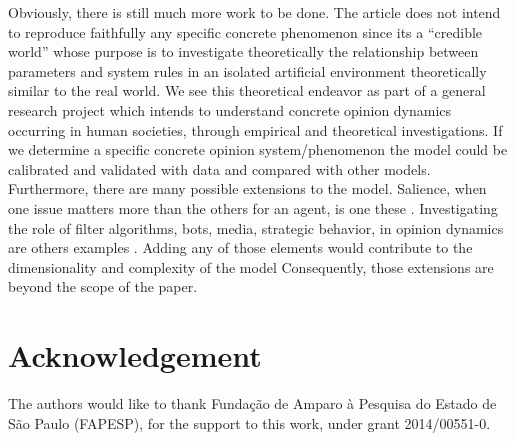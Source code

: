 \documentclass{article}
\begin{document}
    Obviously, there is still much more work to be done. The article does not
    intend to reproduce faithfully any specific concrete phenomenon since its a
    ``credible world'' \cite{sugden2000credible, sugden2009credible} whose
    purpose is to investigate theoretically the relationship between parameters
    and system rules in an isolated artificial environment theoretically similar
    to the real world. We see this theoretical endeavor as part of a general
    research project which intends to understand concrete opinion dynamics
    occurring in human societies, through empirical and theoretical
    investigations. If we determine a specific concrete opinion
    system/phenomenon the model could be calibrated and validated with data and
    compared with other models. Furthermore, there are many possible extensions
    to the model. Salience, when one issue matters more than the others for an
    agent, is one these \cite{hinich1997analytical,basu2019bridging}.
    Investigating the role of filter algorithms, bots, media, strategic
    behavior, in opinion dynamics are others examples \cite{roth2019algorithmic,
      ding2010evolutionary}. Adding any of those elements would contribute to
    the dimensionality and complexity of the model \cite{de2005computational}
    Consequently, those extensions are beyond the scope of the paper.


\section{Acknowledgement}
The authors would like to thank Funda\c{c}\~ao de Amparo \`a Pesquisa do Estado
de S\~ao Paulo (FAPESP), for the support to this work, under grant 2014/00551-0.


%
\printbibliography
\end{document}
